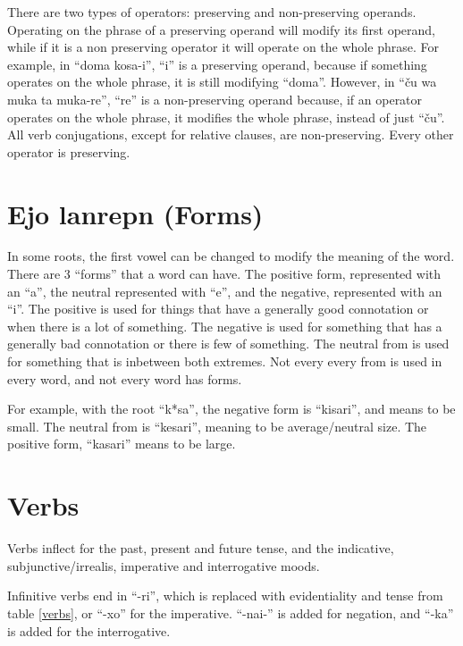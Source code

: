 \documentclass{clgrammar}
\begin{document}
There are two types of operators: preserving and non-preserving operands. Operating on the phrase of a preserving operand will modify its first operand, while if it is a non preserving operator it will operate on the whole phrase. For example, in ``doma kosa-i'', ``i'' is a preserving operand, because if something operates on the whole phrase, it is still modifying ``doma''. However, in ``ču wa muka ta muka-re'', ``re'' is a non-preserving operand because, if an operator operates on the whole phrase, it modifies the whole phrase, instead of just ``ču''. All verb conjugations, except for relative clauses, are non-preserving. Every other operator is preserving.



\chapter{Ejo lanrepn (Forms)}

In some roots, the first vowel can be changed to modify the meaning of the word. There are 3 ``forms'' that a word can have. The positive form, represented with an ``a'', the neutral represented with ``e'', and the negative, represented with an ``i''. The positive is used for things that have a generally good connotation or when there is a lot of something. The negative is used for something that has a generally bad connotation or there is few of something. The neutral from is used for something that is inbetween both extremes. Not every every from is used in every word, and not every word has forms. 

For example, with the root ``k*sa'', the negative form is ``kisari'', and means to be small. The neutral from is ``kesari'', meaning to be average/neutral size. The positive form, ``kasari'' means to be large. 


\chapter{Verbs}

Verbs inflect for the past, present and future tense, and the indicative, subjunctive/irrealis, imperative and interrogative moods. 

Infinitive verbs end in ``-ri'', which is replaced with evidentiality and tense from table \ref{verbs}, or ``-xo'' for the imperative. ``-nai-'' is added for negation, and ``-ka'' is added for the interrogative. 
\end{document}
